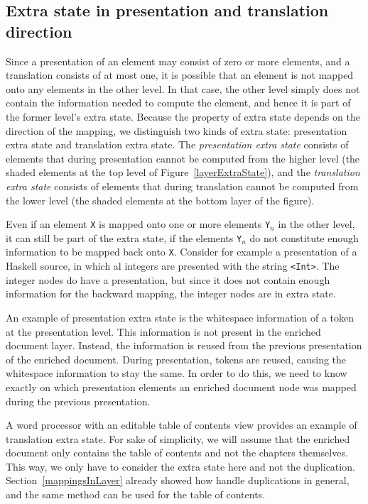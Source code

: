 %																
\subsection{Extra state in presentation and translation direction}

Since a presentation of an element may consist of zero or more elements, and a translation consists of at most one, it is possible that an element is not mapped onto any elements in the other level. In that case, the other level simply does not contain the information needed to compute the element, and hence it is part of the former level's extra state. Because the property of extra state depends on the direction of the mapping, we distinguish two kinds of extra state: presentation extra state and translation extra state. The {\em presentation extra state} consists of elements that during presentation cannot be computed from the higher level (the shaded elements at the top level of Figure~\ref{layerExtraState}), and the {\em translation extra state} consists of elements that during translation cannot be computed from the lower level (the shaded elements at the bottom layer of the figure).

Even if an element \verb|X| is mapped onto one or more elements \verb|Y|$_n$  in the other level, it can still be part of the extra state, if the elements \verb|Y|$_n$ do not constitute enough information to be mapped back onto \verb|X|. Consider for example a presentation of a Haskell source, in which al integers are presented with the string \verb|<Int>|. The integer nodes do have a presentation, but since it does not contain enough information for the backward mapping, the integer nodes are in extra state.  

An example of presentation extra state is the whitespace information of a token at the presentation level. This information is not present in the enriched document layer. Instead, the information is reused from the previous presentation of the enriched document. During presentation, tokens are reused, causing the whitespace information to stay the same. In order to do this, we need to know exactly on which presentation elements an enriched document node was mapped during the previous presentation.

A word processor with an editable table of contents view provides an example of translation extra state.  For sake of simplicity, we will assume that the enriched document only contains the table of contents and not the chapters themselves. This way, we only have to consider the extra state here and not the duplication. Section~\ref{mappingsInLayer} already showed how handle duplications in general, and the same method can be used for the table of contents. 

